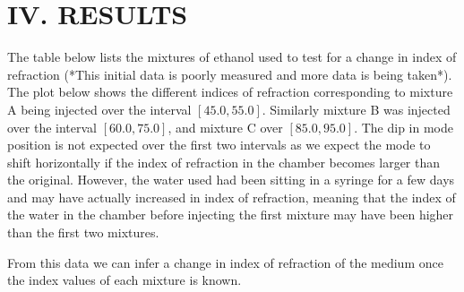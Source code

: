 \section*{IV. RESULTS}
\hspace{0.25in}
The table below lists the mixtures of ethanol used to test for a change in index of refraction (*This initial data is poorly measured and more data is being taken*). The plot below shows the different indices of refraction corresponding to mixture A being injected over the interval $[45.0, 55.0]$. Similarly mixture B was injected over the interval $[60.0, 75.0]$, and mixture C over $[85.0, 95.0]$. The dip in mode position is not expected over the first two intervals as we expect the mode to shift horizontally if the index of refraction in the chamber becomes larger than the original. However, the water used had been sitting in a syringe for a few days and may have actually increased in index of refraction, meaning that the index of the water in the chamber before injecting the first mixture may have been higher than the first two mixtures.


\hspace{0.1in}
From this data we can infer a change in index of refraction of the medium once the index values of each mixture is known.

